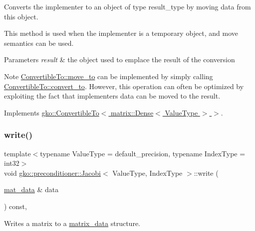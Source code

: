 Converts the implementer to an object of type result\+\_\+type by moving data from this object. 

This method is used when the implementer is a temporary object, and move semantics can be used.


\begin{DoxyParams}{Parameters}
{\em result} & the object used to emplace the result of the conversion\\
\hline
\end{DoxyParams}
\begin{DoxyNote}{Note}
\hyperlink{classgko_1_1ConvertibleTo_ab9047c7c49e0f83c79b54c0034d6197b}{Convertible\+To\+::move\+\_\+to} can be implemented by simply calling \hyperlink{classgko_1_1ConvertibleTo_aa7f3420babcbed39ee15bc020bed4f7e}{Convertible\+To\+::convert\+\_\+to}. However, this operation can often be optimized by exploiting the fact that implementer\textquotesingle{}s data can be moved to the result. 
\end{DoxyNote}


Implements \hyperlink{classgko_1_1ConvertibleTo_ab9047c7c49e0f83c79b54c0034d6197b}{gko\+::\+Convertible\+To$<$ matrix\+::\+Dense$<$ Value\+Type $>$ $>$}.

\mbox{\label{classgko_1_1preconditioner_1_1Jacobi_ac52bb1c70d4882876da1ee21c3b124ee}} 
\subsubsection{\texorpdfstring{write()}{write()}}
{\footnotesize\ttfamily template$<$typename Value\+Type  = default\+\_\+precision, typename Index\+Type  = int32$>$ \\
void \hyperlink{classgko_1_1preconditioner_1_1Jacobi}{gko\+::preconditioner\+::\+Jacobi}$<$ Value\+Type, Index\+Type $>$\+::write (\begin{DoxyParamCaption}\item[{\hyperlink{structgko_1_1matrix__data}{mat\+\_\+data} \&}]{data }\end{DoxyParamCaption}) const\hspace{0.3cm}{\ttfamily [override]}, {\ttfamily [virtual]}}



Writes a matrix to a \hyperlink{structgko_1_1matrix__data}{matrix\+\_\+data} structure. 


